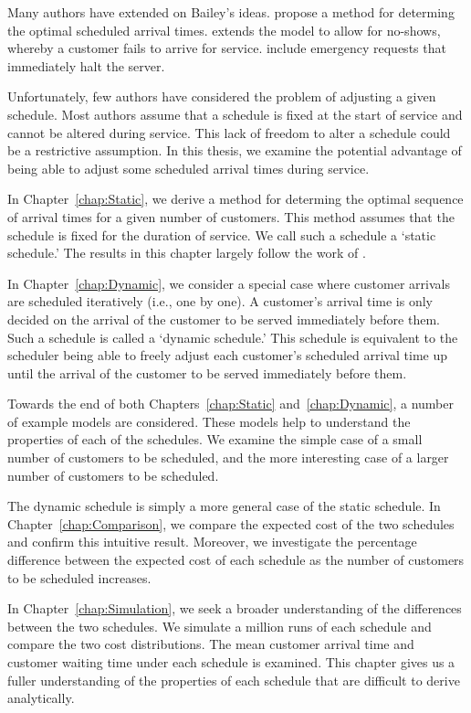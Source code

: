 Many authors have extended on Bailey's ideas. \citet{Pegden} propose a method for determing the optimal scheduled arrival times. \citet{Mendel} extends the model to allow for no-shows, whereby a customer fails to arrive for service. \citet{Fiems} include emergency requests that immediately halt the server.

Unfortunately, few authors have considered the problem of adjusting a given schedule. Most authors assume that a schedule is fixed at the start of service and cannot be altered during service. This lack of freedom to alter a schedule could be a restrictive assumption. In this thesis, we examine the potential advantage of being able to adjust some scheduled arrival times during service.

In Chapter~\ref{chap:Static}, we derive a method for determing the optimal sequence of arrival times for a given number of customers. This method assumes that the schedule is fixed for the duration of service. We call such a schedule a `static schedule.' The results in this chapter largely follow the work of \citet{Pegden}.

In Chapter~\ref{chap:Dynamic}, we consider a special case where customer arrivals are scheduled iteratively (i.e., one by one). A customer's arrival time is only decided on the arrival of the customer to be served immediately before them. Such a schedule is called a `dynamic schedule.' This schedule is equivalent to the scheduler being able to freely adjust each customer's scheduled arrival time up until the arrival of the customer to be served immediately before them.

Towards the end of both Chapters~\ref{chap:Static} and~\ref{chap:Dynamic}, a number of example models are considered. These models help to understand the properties of each of the schedules. We examine the simple case of a small number of customers to be scheduled, and the more interesting case of a larger number of customers to be scheduled.

The dynamic schedule is simply a more general case of the static schedule. In Chapter~\ref{chap:Comparison}, we compare the expected cost of the two schedules and confirm this intuitive result. Moreover, we investigate the percentage difference between the expected cost of each schedule as the number of customers to be scheduled increases.

In Chapter~\ref{chap:Simulation}, we seek a broader understanding of the differences between the two schedules. We simulate a million runs of each schedule and compare the two cost distributions. The mean customer arrival time and customer waiting time under each schedule is examined. This chapter gives us a fuller understanding of the properties of each schedule that are difficult to derive analytically.